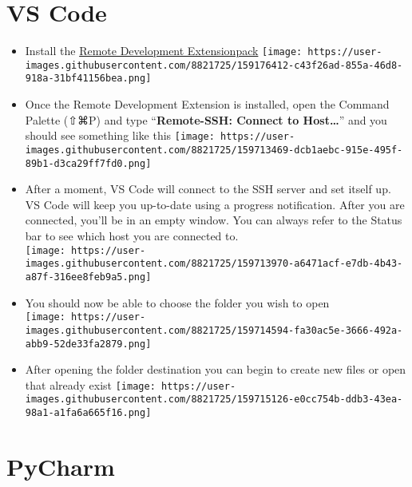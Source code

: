 \documentclass[
  letterpaper,
  DIV=11,
  numbers=noendperiod]{scrreprt}
\begin{document}
\hypertarget{vs-code}{%
\section*{\texorpdfstring{\textbf{VS Code}}{VS Code}}\label{vs-code}}


\begin{itemize}
\item
  Install the
  \href{https://marketplace.visualstudio.com/items?itemName=ms-vscode-remote.vscode-remote-extensionpack}{Remote
  Development Extensionpack}
  \texttt{[image: https://user-images.githubusercontent.com/8821725/159176412-c43f26ad-855a-46d8-918a-31bf41156bea.png]}
\item
  Once the Remote Development Extension is installed, open the Command
  Palette (⇧⌘P) and type ``\textbf{Remote-SSH: Connect to
  Host\ldots{}}'' and you should see something like this
  \texttt{[image: https://user-images.githubusercontent.com/8821725/159713469-dcb1aebc-915e-495f-89b1-d3ca29ff7fd0.png]}
\item
  After a moment, VS Code will connect to the SSH server and set itself
  up. VS Code will keep you up-to-date using a progress notification.
  After you are connected, you'll be in an empty window. You can always
  refer to the Status bar to see which host you are connected to.\\
  \texttt{[image: https://user-images.githubusercontent.com/8821725/159713970-a6471acf-e7db-4b43-a87f-316ee8feb9a5.png]}
\item
  You should now be able to choose the folder you wish to open\\
  \texttt{[image: https://user-images.githubusercontent.com/8821725/159714594-fa30ac5e-3666-492a-abb9-52de33fa2879.png]}
\item
  After opening the folder destination you can begin to create new files
  or open that already exist
  \texttt{[image: https://user-images.githubusercontent.com/8821725/159715126-e0cc754b-ddb3-43ea-98a1-a1fa6a665f16.png]}
\end{itemize}

\hypertarget{pycharm}{%
\section*{\texorpdfstring{\textbf{PyCharm}}{PyCharm}}\label{pycharm}}
\end{document}
